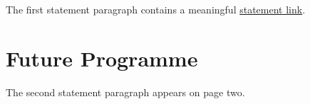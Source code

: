 \documentclass[type=research]{careerdossier-statement}
\begin{document}
\MakeCDossierStatementHeader


The first statement paragraph contains a meaningful
\href{https://example.test/statement-link}{statement link}.

\newpage
\section*{Future Programme}

The second statement paragraph appears on page two.
\end{document}
